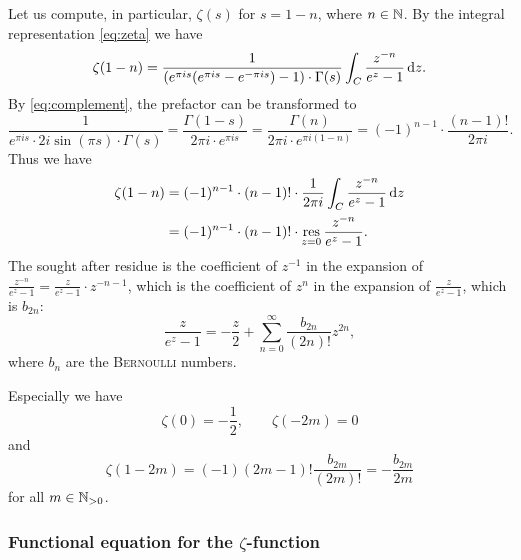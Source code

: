 \documentclass[a4paper,english]{article}
\begin{document}
Let us compute, in particular, $\zeta(s)$ for $s = 1 - n$, where $n \in \operatorname{\mathbb{N}}$.
By the integral representation \eqref{eq:zeta} we have
\begin{equation*}
    \zeta(1 - n)
    = \frac{1}{(e^{\pi i s}(e^{\pi i s} - e^{- \pi i s}) - 1) \cdot \Gamma(s)} \int_{C} \frac{z^{- n}}{e^{z} - 1} \mathop{}\!\mathrm{d}{z}.
\end{equation*}
By \eqref{eq:complement}, the prefactor can be transformed to
\begin{equation*}
    \frac{1}{e^{\pi i s} \cdot 2 i \sin(\pi s) \cdot \Gamma(s)}
    = \frac{\Gamma(1 - s)}{2 \pi i \cdot e^{\pi i s}}
    = \frac{\Gamma(n)}{2 \pi i \cdot e^{\pi i (1 - n)}}
    = (- 1)^{n - 1} \cdot \frac{(n - 1)!}{2 \pi i}.
\end{equation*}
Thus we have
\begin{align*}
    \zeta(1 - n)
    & = (- 1)^{n - 1} \cdot (n - 1)!\cdot \frac{1}{2 \pi i} \int_{C} \frac{z^{- n}}{e^{z} - 1} \mathop{}\!\mathrm{d}{z} \\
    & = (- 1)^{n - 1} \cdot (n - 1)!\cdot \operatorname*{res}_{z = 0} \frac{z^{-n}}{e^{z} - 1}.
\end{align*}
The sought after residue is the coefficient of $z^{-1}$ in the expansion of $\frac{z^{-n}}{e^{z} - 1} = \frac{z}{e^{z} - 1} \cdot z^{-n - 1}$, which is the coefficient of $z^{n}$ in the expansion of $\frac{z}{e^z - 1}$, which is $b_{2n}$:
\begin{equation*}
    \frac{z}{e^{z} - 1}
    = - \frac{z}{2} + \sum_{n = 0}^{\infty} \frac{b_{2n}}{(2n)!} z^{2n},
\end{equation*}
where $b_n$ are the \textsc{Bernoulli} numbers.

Especially we have
\begin{equation} \label{eq:zeta1}
    \zeta(0)
    = - \frac{1}{2}, \qquad
    \zeta( - 2 m) = 0
\end{equation}
and
\begin{equation} \label{eq:zeta2}
    \zeta(1 - 2m)
    = (-1) (2 m - 1)! \frac{b_{2m}}{(2 m)!}
    = - \frac{b_{2m}}{2m}
\end{equation}
for all $m \in \operatorname{\mathbb{N}}_{>0}$.

\subsubsection{Functional equation for the $\zeta$-function}
\end{document}
